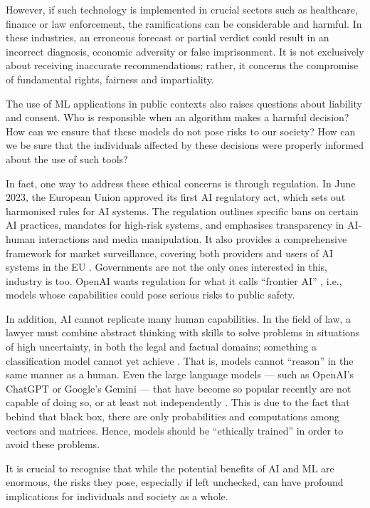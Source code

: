 \documentclass[twoside,11pt]{article}
\begin{document}
However,  if such technology is implemented in crucial sectors such as healthcare, finance or law enforcement, the ramifications can be considerable and harmful. In these industries, an erroneous forecast or partial verdict could result in an incorrect diagnosis, economic adversity or false imprisonment. It is not exclusively about receiving inaccurate recommendations; rather, it concerns the compromise of fundamental rights, fairness and impartiality.

The use of ML applications in public contexts also raises questions about liability and consent. Who is responsible when an algorithm makes a harmful decision? How can we ensure that these models do not pose risks to our society? How can we be sure that the individuals affected by these decisions were properly informed about the use of such tools? 

In fact, one way to address these ethical concerns is through regulation. In June 2023, the European Union approved its first AI regulatory act, which sets out harmonised rules for AI systems. The regulation outlines specific bans on certain AI practices, mandates for high-risk systems, and emphasises transparency in AI-human interactions and media manipulation. It also provides a comprehensive framework for market surveillance, covering both providers and users of AI systems in the EU .  Governments are not the only ones interested in this, industry is too. OpenAI wants regulation for what it calls ``frontier AI'' , i.e., models whose capabilities could pose serious risks to public safety. 

In addition, AI cannot replicate many human capabilities. In the field of law, a lawyer must combine abstract thinking with skills to solve problems in situations of high uncertainty, in both the legal and factual domains; something a classification model cannot yet achieve . That is, models cannot “reason” in the same manner as a human. Even the large language models — such as OpenAI's ChatGPT or Google's Gemini — that have become so popular recently are not capable of doing so, or at least not independently . This is due to the fact that behind that black box, there are only probabilities and computations among vectors and matrices. Hence, models should be ``ethically trained'' in order to avoid these problems.

It is crucial to recognise that while the potential benefits of AI and ML are enormous, the risks they pose, especially if left unchecked, can have profound implications for individuals and society as a whole.
\end{document}
